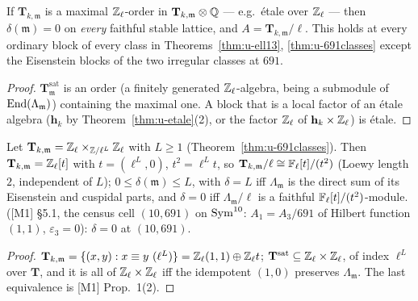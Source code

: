 \documentclass[11pt]{article}
\newcommand{\hcusp}{\mathbf{h}}                   %
\newcommand{\Tu}{\mathbf{T}}                      %
\newcommand{\Zl}{\Z_\ell}
\begin{document}
\begin{proposition}\label{prop:u-maxorder}
\PROVED{} If $\Tu_{k,\mathfrak m}$ is a maximal $\Zl$-order in $\Tu_{k,\mathfrak m}\otimes\Q$ --- e.g.\ étale over $\Zl$ --- then $\delta(\mathfrak m)=0$ on
\emph{every} faithful stable lattice, and $A=\Tu_{k,\mathfrak m}/\ell$. This holds at every ordinary block of every class in
Theorems~\ref{thm:u-ell13}, \ref{thm:u-691classes} except the Eisenstein blocks of the two irregular classes at $691$.
\end{proposition}

\begin{proof}
$\Tu^{\mathrm{sat}}_{\mathfrak m}$ is an order (a finitely generated $\Zl$-algebra, being a submodule of $\mathrm{End}(\Lambda_{\mathfrak m})$) containing the maximal one.
A block that is a local factor of an étale algebra ($\hcusp_k$ by Theorem~\ref{thm:u-etale}(2), or the factor $\Zl$ of $\hcusp_k\times\Zl$) is étale.
\end{proof}

\begin{proposition}\label{prop:u-eisblock}
\PROVED{} Let $\Tu_{k,\mathfrak m}=\Zl\times_{\Z/\ell^{L}}\Zl$ with $L\ge1$ (Theorem~\ref{thm:u-691classes}). Then $\Tu_{k,\mathfrak m}=\Zl[t]$ with $t=(\ell^{L},0)$,
$t^{2}=\ell^{L}t$, so $\Tu_{k,\mathfrak m}/\ell\cong\Fl[t]/(t^{2})$ (Loewy length $2$, independent of $L$); $0\le\delta(\mathfrak m)\le L$, with $\delta=L$ iff
$\Lambda_{\mathfrak m}$ is the direct sum of its Eisenstein and cuspidal parts, and $\delta=0$ iff $\Lambda_{\mathfrak m}/\ell$ is a faithful
$\mathbb{F}_\ell[t]/(t^{2})$-module. \COMP{} ([M1] \S5.1, the census cell $(10,691)$ on $\mathrm{Sym}^{10}$: $A_1=A_3/691$ of Hilbert function $(1,1)$, $\varepsilon_3=0$):
$\delta=0$ at $(10,691)$.
\end{proposition}

\begin{proof}
$\Tu_{k,\mathfrak m}=\{(x,y):x\equiv y\ (\ell^{L})\}=\Zl(1,1)\oplus\Zl t$; $\Tu^{\mathrm{sat}}\subseteq\Zl\times\Zl$, of index $\ell^{L}$ over $\Tu$, and it is all of
$\Zl\times\Zl$ iff the idempotent $(1,0)$ preserves $\Lambda_{\mathfrak m}$. The last equivalence is [M1] Prop.~1(2).
\end{proof}
\end{document}
